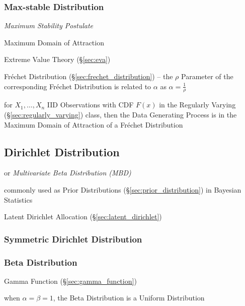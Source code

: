 \subsubsection{Max-stable Distribution}\label{sec:max_stable}

\emph{Maximum Stability Postulate}

Maximum Domain of Attraction

\fist Extreme Value Theory (\S\ref{sec:eva})

Fr\'echet Distribution (\S\ref{sec:frechet_distribution}) -- the $\rho$
Parameter of the corresponding Fr\'echet Distribution is related to $\alpha$ as
$\alpha = \frac{1}{\rho}$

for $X_1, \ldots, X_n$ IID Observations with CDF $F(x)$ in the Regularly Varying
(\S\ref{sec:regularly_varying}) class, then the Data Generating Process is in
the Maximum Domain of Attraction of a Fr\'echet Distribution



\subsection{Dirichlet Distribution}\label{sec:dirichlet_distribution}

or \emph{Multivariate Beta Distribution (MBD)}

commonly used as Prior Distributions (\S\ref{sec:prior_distribution}) in
Bayesian Statistics

\fist Latent Dirichlet Allocation (\S\ref{sec:latent_dirichlet})



\subsubsection{Symmetric Dirichlet Distribution}\label{sec:symmetric_dirichlet}

\subsubsection{Beta Distribution}\label{sec:beta_distribution}

Gamma Function (\S\ref{sec:gamma_function})

when $\alpha = \beta = 1$, the Beta Distribution is a Uniform Distribution



